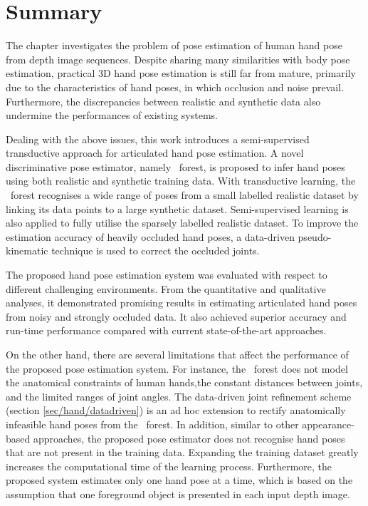 \section{Summary}

The chapter investigates the problem of pose estimation of human hand pose from depth image sequences. 
Despite sharing many similarities with body pose estimation, practical 3D hand pose estimation is still far from mature, primarily due to the characteristics of hand poses, in which occlusion and noise prevail. 
Furthermore, the discrepancies between realistic and synthetic data also undermine the performances of existing systems. 

Dealing with the above issues, this work introduces a semi-supervised transductive approach for articulated hand pose estimation. A novel discriminative pose estimator, namely \STR\ forest, is proposed to infer hand poses using both realistic and synthetic training data. 
With transductive learning, the \STR\ forest recognises a wide range of poses from a small labelled realistic dataset by linking its data points to a large synthetic dataset.
Semi-supervised learning is also applied to fully utilise the sparsely labelled realistic dataset. 
To improve the estimation accuracy of heavily occluded hand poses, a data-driven pseudo-kinematic technique is used to correct the occluded joints.  

The proposed hand pose estimation system was evaluated with respect to different challenging environments. From the quantitative and qualitative analyses, it demonstrated promising results in estimating articulated hand poses from noisy and strongly occluded data. It also achieved superior accuracy and run-time performance compared with current state-of-the-art approaches. 

On the other hand, there are several limitations that affect the performance of the proposed pose estimation system. 
For instance, the \STR\ forest does not model the anatomical constraints of human hands,\eg the constant distances between joints, and the limited ranges of joint angles. The data-driven joint refinement scheme (section \ref{sec/hand/datadriven}) is an ad hoc extension to rectify anatomically infeasible hand poses from the \STR\ forest. In addition, similar to other appearance-based approaches, the proposed pose estimator does not recognise hand poses that are not present in the training data. Expanding the training dataset greatly increases the computational time of the learning process. 
Furthermore, the proposed system estimates only one hand pose at a time, which is based on the assumption that one foreground object is presented in each input depth image.    
